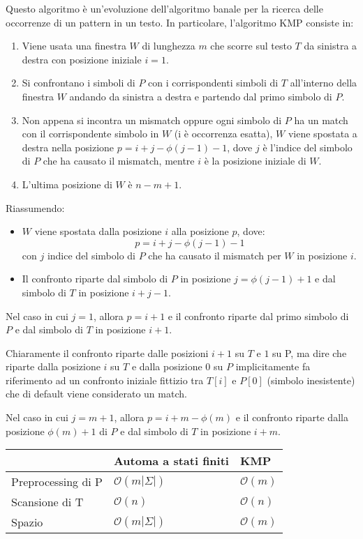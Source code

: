 Questo algoritmo è un’evoluzione dell'algoritmo banale per la ricerca delle
occorrenze di un pattern in un testo. In particolare, l'algoritmo KMP consiste in:
\begin{enumerate}
    \item Viene usata una finestra $W$ di lunghezza $m$ che scorre sul testo $T$
          da sinistra a destra con posizione iniziale $i = 1$.
    \item Si confrontano i simboli di $P$ con i corrispondenti simboli di $T$
          all'interno della finestra $W$ andando da sinistra a destra e partendo
          dal primo simbolo di $P$.
    \item Non appena si incontra un mismatch oppure ogni simbolo di $P$ ha un
          match con il corrispondente simbolo in $W$ (i è occorrenza esatta), $W$ viene
          spostata a destra nella posizione $p = i + j - \phi(j - 1) - 1$, dove $j$ è
          l'indice del simbolo di $P$ che ha causato il mismatch, mentre $i$ è
          la posizione iniziale di $W$.
    \item L'ultima posizione di $W$ è $n - m + 1$.
\end{enumerate}
Riassumendo:
\begin{itemize}
    \item $W$ viene spostata dalla posizione $i$ alla posizione $p$, dove:
          $$p = i + j - \phi(j - 1) - 1$$ con $j$ indice del simbolo di $P$ che ha
          causato il mismatch per $W$ in posizione $i$.
    \item Il confronto riparte dal simbolo di $P$ in posizione $j = \phi(j - 1) + 1$
          e dal simbolo di $T$ in posizione $i + j - 1$.
\end{itemize}
Nel caso in cui $j = 1$, allora $p = i + 1$ e il confronto riparte dal primo
simbolo di $P$ e dal simbolo di $T$ in posizione $i + 1$.
\begin{nota}
    Chiaramente il confronto riparte dalle posizioni $i + 1$ su $T$ e $1$ su P,
    ma dire che riparte dalla posizione $i$ su $T$ e dalla posizione $0$ su $P$
    implicitamente fa riferimento ad un confronto iniziale fittizio tra $T[i]$ e
    $P[0]$ (simbolo inesistente) che di default viene considerato un match.
\end{nota}
Nel caso in cui $j = m + 1$, allora $p = i + m - \phi(m)$ e il confronto
riparte dalla posizione $\phi(m) + 1$ di $P$ e dal simbolo di $T$ in posizione $i + m$.
\begin{table}[!ht]
    \centering
    \begin{tabular}{|l|l|l|}
        \hline
                           & Automa a stati finiti       & KMP              \\ \hline
        Preprocessing di P & $\mathcal{O}(m | \Sigma |)$ & $\mathcal{O}(m)$ \\ \hline
        Scansione di T     & $\mathcal{O}(n)$            & $\mathcal{O}(n)$ \\ \hline
        Spazio             & $\mathcal{O}(m | \Sigma |)$ & $\mathcal{O}(m)$ \\ \hline
    \end{tabular}
\end{table}
